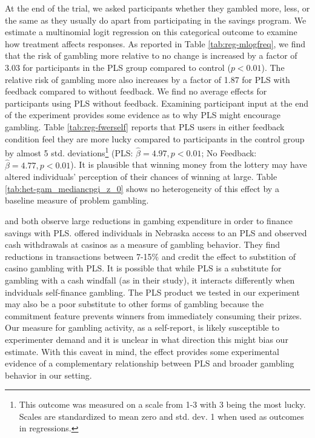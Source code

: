 \documentclass[12pt]{article}
\begin{document}
		At the end of the trial, we asked participants whether they gambled more, less, or the same as they usually do apart from participating in the savings program. We estimate a multinomial logit regression on this categorical outcome to examine how treatment affects responses. As reported in Table \ref{tab:reg-mlogfreq}, we find that the risk of gambling more relative to no change is increased by a factor of 3.03 for participants in the PLS group compared to control ($p < 0.01$). The relative risk of gambling more also increases by a factor of 1.87 for PLS with feedback compared to without feedback. We find no average effects for participants using PLS without feedback. Examining participant input at the end of the experiment provides some evidence as to why PLS might encourage gambling. Table \ref{tab:reg-fwerself} reports that PLS users in either feedback condition feel they are more lucky compared to participants in the control group by almost 5 std. deviations\footnote{This outcome was measured on a scale from 1-3 with 3 being the most lucky. Scales are standardized to mean zero and std. dev. 1 when used as outcomes in regressions.} (PLS: $\hat \beta = 4.97, p < 0.01$; No Feedback: $\hat \beta = 4.77, p < 0.01$). It is plausible that winning money from the lottery may have altered individuals' perception of their chances of winning at large. Table \ref{tab:het-gam_mediancpgi_z_0} shows no heterogeneity of this effect by a baseline measure of problem gambling.

		\textcite{atalay_savings_2014} and \textcite{dizon_leveraging_2016} both observe large reductions in gambing expenditure in order to finance savings with PLS. \textcite{cookson_when_2016} offered individuals in Nebraska access to an PLS and observed cash withdrawals at casinos as a measure of gambling behavior. They find reductions in transactions between 7-15\% and credit the effect to substition of casino gambling with PLS. It is possible that while PLS is a substitute for gambling with a cash windfall (as in their study), it interacts differently when indviduals self-finance gambling. The PLS product we tested in our experiment may also be a poor substitute to other forms of gambling because the commitment feature prevents winners from immediately consuming their prizes. Our measure for gambling activity, as a self-report, is likely susceptible to experimenter demand and it is unclear in what direction this might bias our estimate. With this caveat in mind, the effect provides some experimental evidence of a complementary relationship between PLS and broader gambling behavior in our setting.
\end{document}
